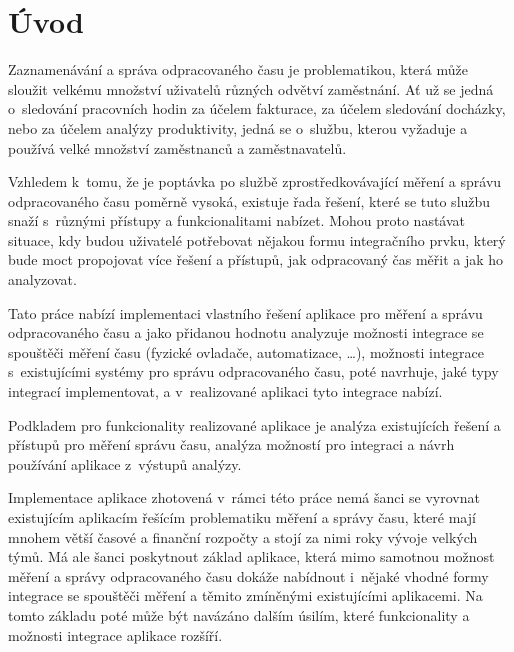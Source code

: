 
\graphicspath{ {./images} }

\chapter*{Úvod}
\setcounter{page}{1}

Zaznamenávání a správa odpracovaného času je problematikou, která může sloužit velkému množství uživatelů různých odvětví zaměstnání. Ať už se jedná o~sledování pracovních hodin za účelem fakturace, za účelem sledování docházky, nebo za účelem analýzy produktivity, jedná se o~službu, kterou vyžaduje a používá velké množství zaměstnanců a zaměstnavatelů.

Vzhledem k~tomu, že je poptávka po službě zprostředkovávající měření a správu odpracovaného času poměrně vysoká, existuje řada řešení, které se tuto službu snaží s~různými přístupy a funkcionalitami nabízet. Mohou proto nastávat situace, kdy budou uživatelé potřebovat nějakou formu integračního prvku, který bude moct propojovat více řešení a přístupů, jak odpracovaný čas měřit a jak ho analyzovat. 

Tato práce nabízí implementaci vlastního řešení aplikace pro měření a správu odpracovaného času a jako přidanou hodnotu analyzuje možnosti integrace se spouštěči měření času (fyzické ovladače, automatizace, \dots), možnosti integrace s~existujícími systémy pro správu odpracovaného času, poté navrhuje, jaké typy integrací implementovat, a v~realizované aplikaci tyto integrace nabízí.

Podkladem pro funkcionality realizované aplikace je analýza existujících řešení a přístupů pro měření správu času, analýza možností pro integraci a návrh používání aplikace z~výstupů analýzy.

Implementace aplikace zhotovená v~rámci této práce nemá šanci se vyrovnat existujícím aplikacím řešícím problematiku měření a správy času, které mají mnohem větší časové a finanční rozpočty a stojí za nimi roky vývoje velkých týmů. Má ale šanci poskytnout základ aplikace, která mimo samotnou možnost měření a správy odpracovaného času dokáže nabídnout i~nějaké vhodné formy integrace se spouštěči měření a těmito zmíněnými existujícími aplikacemi. Na tomto základu poté může být navázáno dalším úsilím, které funkcionality a možnosti integrace aplikace rozšíří. 

